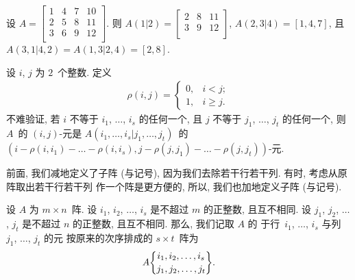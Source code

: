 \documentclass[../libro.tex]{subfiles}
\begin{document}
\begin{example}
    设
    \(
        A =
        \begin{bmatrix}
            1 & 4 & 7 & 10 \\
            2 & 5 & 8 & 11 \\
            3 & 6 & 9 & 12 \\
        \end{bmatrix}.
    \)
    则
    \(
        A({1}|{2}) =
        \begin{bmatrix}
            2 & 8 & 11 \\
            3 & 9 & 12 \\
        \end{bmatrix}
    \),
    \(
        A({2,3}|{4}) =
        [1, 4, 7]
    \),
    且
    \(
        A({3,1}|{4,2}) = A({1,3}|{2,4}) =
        [2, 8]
    \).
\end{example}

设 \(i\), \(j\) 为 \(2\)~个整数.
定义
\begin{align*}
    \rho(i, j) =
    \begin{cases}
        0, & i < j;    \\
        1, & i \geq j.
    \end{cases}
\end{align*}
不难验证,
若 \(i\) 不等于 \(i_1\), \(\dots\), \(i_s\) 的任何一个,
且 \(j\) 不等于 \(j_1\), \(\dots\), \(j_t\) 的任何一个,
则 \(A\)~的 \((i, j)\)-元是
\(A({i_1, \dots, i_s}|{j_1, \dots, j_t})\)~的
\((i - \rho(i, i_1) - \dots - \rho(i, i_s),
j - \rho(j, j_1) - \dots - \rho(j, j_t))\)-元.

前面, 我们减地定义了子阵 (与记号),
因为我们去除若干行若干列.
有时, 考虑从原阵取出若干行若干列%
作一个阵是更方便的,
所以, 我们也加地定义子阵 (与记号).

\begin{definition}[子阵, 2]
    设 \(A\) 为 \(m \times n\)~阵.
    设 \(i_1\), \(i_2\), \(\dots\), \(i_s\)
    是不超过 \(m\) 的正整数,
    且互不相同.
    设 \(j_1\), \(j_2\), \(\dots\), \(j_t\)
    是不超过 \(n\) 的正整数,
    且互不相同.
    那么, 我们记取 \(A\) 的%
    于行~\(i_1\), \(\dots\), \(i_s\)
    与列~\(j_1\), \(\dots\), \(j_t\) 的元%
    按原来的次序排成的 \(s \times t\)~阵为
    \begin{align*}
        A\submat{i_1, i_2, \dots, i_s}{j_1, j_2, \dots, j_t}.
    \end{align*}
\end{definition}
\end{document}

